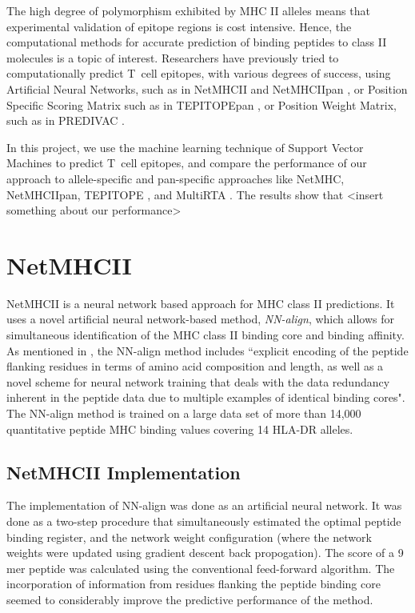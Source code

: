 \documentclass[journal]{IEEEtran}
\begin{document}
The high degree of polymorphism exhibited by MHC II alleles means that experimental validation of epitope regions is cost intensive. Hence, the computational methods for accurate prediction of binding peptides to class II molecules is a topic of interest. Researchers have previously tried to computationally predict T~cell epitopes, with various degrees of success, using Artificial Neural Networks, such as in NetMHCII \cite{NetMHCII} and NetMHCIIpan \cite{NetMHCIIpan}, or Position Specific Scoring Matrix such as in TEPITOPEpan \cite{TEPITOPEpan}, or Position Weight Matrix, such as in PREDIVAC \cite{PREDIVAC}. 

In this project, we use the machine learning technique of Support Vector Machines to predict T~cell epitopes, and compare the performance of our approach to allele-specific and pan-specific approaches like NetMHC, NetMHCIIpan, TEPITOPE \cite{TEPITOPE}, and MultiRTA \cite{MultiRTA}. The results show that <insert something about our performance>


\section{NetMHCII}
NetMHCII is a neural network based approach for MHC class II predictions. It uses a novel artificial neural network-based method, \textit{NN-align}, which allows for simultaneous identification of the MHC class II binding core and binding affinity. As mentioned in \cite{NetMHCII}, the NN-align method includes ``explicit encoding of the peptide flanking residues in terms of amino acid composition and length, as well as a novel scheme for neural network training that deals with the data redundancy inherent in the peptide data due to multiple examples of identical binding cores". The NN-align method is trained on a large data set of more than 14,000 quantitative peptide MHC binding values covering 14 HLA-DR alleles.

\subsection{NetMHCII Implementation}
The implementation of NN-align was done as an artificial neural network. It was done as a two-step procedure that simultaneously estimated the optimal peptide binding register, and the network weight configuration (where the network weights were updated using gradient descent back propogation). The score of a 9 mer peptide was calculated using the conventional feed-forward algorithm. The incorporation of information from residues flanking the peptide binding core seemed to considerably improve the predictive performance of the method. 
\end{document}
